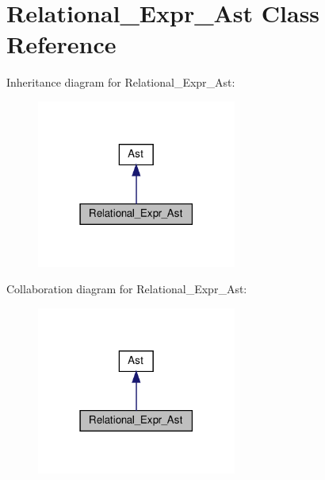 \hypertarget{classRelational__Expr__Ast}{}\section{Relational\+\_\+\+Expr\+\_\+\+Ast Class Reference}
\label{classRelational__Expr__Ast}


Inheritance diagram for Relational\+\_\+\+Expr\+\_\+\+Ast\+:
\nopagebreak
\begin{figure}[H]
\begin{center}
\leavevmode
\includegraphics[width=186pt]{classRelational__Expr__Ast__inherit__graph}
\end{center}
\end{figure}


Collaboration diagram for Relational\+\_\+\+Expr\+\_\+\+Ast\+:
\nopagebreak
\begin{figure}[H]
\begin{center}
\leavevmode
\includegraphics[width=186pt]{classRelational__Expr__Ast__coll__graph}
\end{center}
\end{figure}
